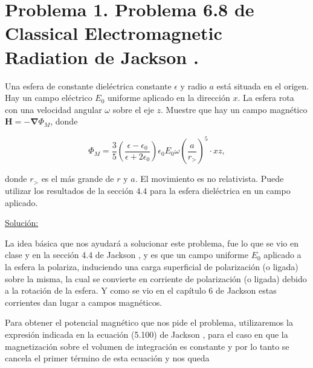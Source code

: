 \documentclass[a4paper,11pt]{article}
\numberwithin{equation}{section}
\renewcommand{\thefootnote}{\fnsymbol{footnote}}
\begin{document}
\fancyhead[R]{\thepage}

\setcounter{footnote}{0}
\renewcommand*{\thefootnote}{\arabic{footnote}}


\section{Problema 1. Problema 6.8 de Classical Electromagnetic Radiation
de Jackson \cite{jackson}.}

Una esfera de constante dieléctrica constante $\epsilon$ y radio $a$ está situada 
en el origen. Hay un campo eléctrico $E_0$ uniforme aplicado en la dirección $x$. 
La esfera rota con una velocidad angular $\omega$ sobre el eje $z$. Muestre que 
hay un campo magnético $\mathbf{H} = - \mathbf{\nabla} \Phi_M$, donde 

$$
\Phi_M = \frac{3}{5}\left(\frac{\epsilon - \epsilon_0}{\epsilon + 2\epsilon_0}\right)
\epsilon_0E_0\omega\left(\frac{a}{r_>}\right)^5\cdot xz,
$$

donde $r_>$ es el más grande de $r$ y $a$. El movimiento es no relativista. Puede 
utilizar los resultados de la sección $4.4$ para la esfera dieléctrica en un campo 
aplicado.

\vspace{.3cm}

\underline{Solución:} \vspace{.3cm}

La idea básica que nos ayudará a solucionar este problema, fue lo que se vio en 
clase y en la sección 4.4 de Jackson \cite{jackson}, y es que un campo uniforme
$E_0$ aplicado a la esfera la polariza, induciendo una carga superficial de 
polarización (o ligada) sobre la misma, la cual se convierte en corriente de 
polarización (o ligada) debido a la rotación de la esfera. Y como se vio en el 
capítulo 6 de Jackson \cite{jackson} estas corrientes dan lugar a campos 
magnéticos.

\vspace{.3cm}

Para obtener el potencial magnético que nos pide el problema, utilizaremos la expresión 
indicada en la ecuación (5.100) de Jackson \cite{jackson}, para el caso en que 
la magnetización sobre el volumen de integración es constante y por lo tanto 
se cancela el primer término de esta ecuación y nos queda 
\end{document}
